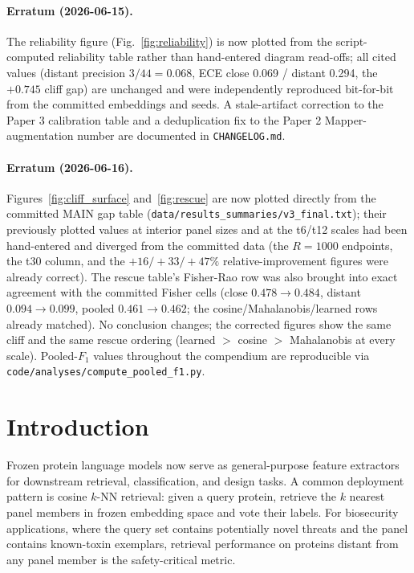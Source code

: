 \documentclass[11pt]{article}
\begin{document}
\paragraph{Erratum (2026-06-15).} The reliability figure (Fig.~\ref{fig:reliability}) is now plotted from the script-computed reliability table rather than hand-entered diagram read-offs; all cited values (distant precision $3/44=0.068$, ECE close 0.069 / distant 0.294, the $+0.745$ cliff gap) are unchanged and were independently reproduced bit-for-bit from the committed embeddings and seeds. A stale-artifact correction to the Paper 3 calibration table and a deduplication fix to the Paper 2 Mapper-augmentation number are documented in \texttt{CHANGELOG.md}.

\paragraph{Erratum (2026-06-16).} Figures~\ref{fig:cliff_surface} and~\ref{fig:rescue} are now plotted directly from the committed MAIN gap table (\texttt{data/results\_summaries/v3\_final.txt}); their previously plotted values at interior panel sizes and at the t6/t12 scales had been hand-entered and diverged from the committed data (the $R{=}1000$ endpoints, the t30 column, and the $+16/+33/+47\%$ relative-improvement figures were already correct). The rescue table's Fisher-Rao row was also brought into exact agreement with the committed Fisher cells (close $0.478\to0.484$, distant $0.094\to0.099$, pooled $0.461\to0.462$; the cosine/Mahalanobis/learned rows already matched). No conclusion changes; the corrected figures show the same cliff and the same rescue ordering (learned $>$ cosine $>$ Mahalanobis at every scale). Pooled-$F_1$ values throughout the compendium are reproducible via \texttt{code/analyses/compute\_pooled\_f1.py}.

\section{Introduction}
Frozen protein language models \cite{lin2023evolutionary,elnaggar2022prottrans,brandes2022proteinbert,madani2023progen} now serve as general-purpose feature extractors for downstream retrieval, classification, and design tasks. A common deployment pattern is cosine $k$-NN retrieval: given a query protein, retrieve the $k$ nearest panel members in frozen embedding space and vote their labels. For biosecurity applications, where the query set contains potentially novel threats and the panel contains known-toxin exemplars, retrieval performance on proteins distant from any panel member is the safety-critical metric.
\end{document}
